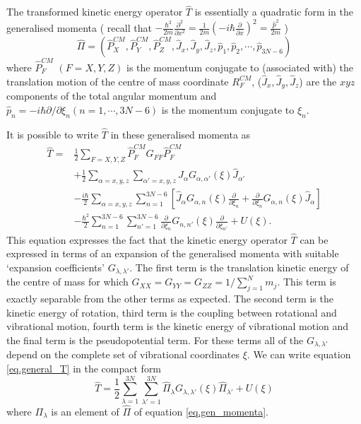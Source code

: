 The transformed kinetic energy operator $\hat{T}$ is essentially a quadratic form in the generalised momenta
 ( recall that $-\frac{\hbar^2}{2m} \frac{\partial^2 }{ \partial x^2 } = \frac{1}{2m} \left( -i \hbar 
\frac{\partial}{\partial x} \right)^2 = \frac{\hat{p}^2}{2m}$ )
\begin{equation}
\label{eq.gen_momenta}
\hat{\Pi} = \left(\hat{P}_X^{CM}, \hat{P}_Y^{CM},\hat{P}_Z^{CM},\hat{J}_x,\hat{J}_y,\hat{J}_z,\hat{p}_1,\hat{p}_2, \cdots
,\hat{p}_{3N-6} \right)
\end{equation}
where $\hat{P}_F^{CM}$ $(F=X,Y,Z)$ is the momentum conjugate to (associated with) the translation motion of the centre
of mass coordinate $R_F^{CM}$, ($\hat{J}_x, \hat{J}_y, \hat{J}_z$) are the $xyz$ components of the total angular momentum
and $\hat{p}_n = -i \hbar \partial / \partial \xi_n (n=1, \cdots , 3N-6)$ is the momentum conjugate to $\xi_n$. 

It is possible to write $\hat{T}$ in these generalised momenta as 
\begin{align}
\label{eq.general_T}
\hat{T} = & \frac{1}{2} \sum_{F=X,Y,Z} \hat{P}_F^{CM} G_{FF} \hat{P}_F^{CM} \\ \nonumber
          & + \frac{1}{2} \sum_{\alpha=x,y,z} \sum_{\alpha'=x,y,z} \hat{J}_{\alpha} G_{\alpha,\alpha'}(\xi) \hat{J}_{\alpha'} \\ \nonumber
          & -\frac{i \hbar}{2} \sum_{\alpha=x,y,z} \sum_{n=1}^{3N-6} \left[\hat{J}_{\alpha} G_{\alpha,n}(\xi) 
          \frac{\partial}{\partial \xi_n} + \frac{\partial}{\partial \xi_n} G_{\alpha,n}(\xi) \hat{J}_{\alpha} \right] \\ \nonumber
          & -\frac{\hbar^2}{2} \sum_{n=1}^{3N-6} \sum_{n'=1}^{3N-6} \frac{\partial}{\partial \xi_n} G_{n,n'}(\xi) 
          \frac{\partial}{\partial \xi_{n'}} + U(\xi).
\end{align}
This equation expresses the fact that the kinetic energy operator $\hat{T}$ can be expressed in terms of an expansion of the
generalised momenta with suitable `expansion coefficients' $G_{\lambda,\lambda'}$. 
The first term is the translation kinetic energy of the
centre of mass for which $G_{XX} = G_{YY} = G_{ZZ} = 1 / \sum_{j=1}^N m_j$. This term is exactly separable from the other terms
as expected. The second term is the kinetic energy of rotation, third term is the coupling between rotational and vibrational
motion, fourth term is the kinetic energy of vibrational motion and the final term is the pseudopotential term. For these 
terms all of the $G_{\lambda,\lambda'}$ depend on the complete set of vibrational coordinates $\xi$.  We can write 
equation \ref{eq.general_T} in the compact form 
\begin{equation}
\label{eq.general_T_compact}
\hat{T} = \frac{1}{2} \sum_{\lambda=1}^{3N} \sum_{\lambda'=1}^{3N} \hat{\Pi}_{\lambda} G_{\lambda,\lambda'}(\xi)
\hat{\Pi}_{\lambda'} + U(\xi) 
\end{equation}
where $\Pi_{\lambda}$ is an element of $\hat{\Pi}$ of equation \ref{eq.gen_momenta}. 

